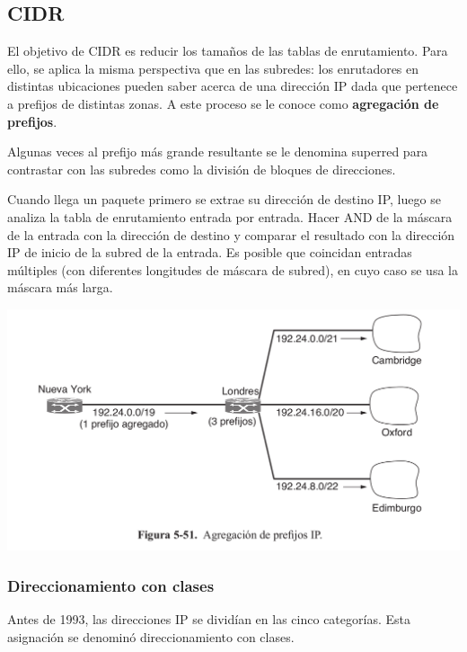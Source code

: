 	\subsection{CIDR}

	El objetivo de CIDR es reducir los tamaños de las tablas de enrutamiento. Para ello, se aplica la misma perspectiva que en las subredes: los enrutadores en distintas 			ubicaciones pueden saber acerca de una dirección IP dada que pertenece a prefijos de distintas zonas. A este proceso se le conoce como \textbf{agregación de prefijos}. 		\par Algunas veces al prefijo más grande resultante se le denomina superred para contrastar con las subredes como la división de bloques
de direcciones.
	\par Cuando llega un paquete primero se extrae su dirección de destino IP, luego se analiza la tabla de enrutamiento entrada por entrada. Hacer AND de la máscara de la entrada con la dirección de destino y comparar el resultado con la dirección IP de inicio de la subred de la entrada. Es posible que coincidan entradas múltiples (con diferentes longitudes de máscara de subred), en cuyo caso se usa la máscara más larga.
	
	\begin{center}
		\includegraphics[scale=0.3]{./imagenes/agregacionPrefijosIP.png} 
	\end{center}	
	
	\subsubsection{Direccionamiento con clases}
	Antes de 1993, las direcciones IP se dividían en las cinco categorías. Esta asignación se denominó direccionamiento con clases.	
	
